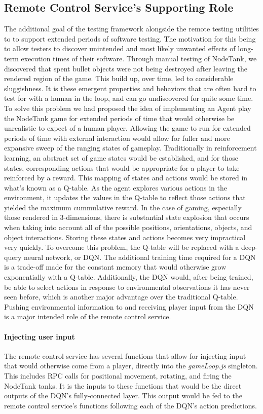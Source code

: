 \documentclass[conference]{IEEEtran}
\begin{document}
\subsection{Remote Control Service's Supporting Role}
The additional goal of the testing framework alongside the remote testing utilities to to support extended periods of software testing. The motivation for this being to allow testers to discover unintended and most likely unwanted effects of long-term execution times of their software. Through manual testing of NodeTank, we discovered that spent bullet objects were not being destroyed after leaving the rendered region of the game. This build up, over time, led to considerable sluggishness. It is these emergent properties and behaviors that are often hard to test for with a human in the loop, and can go undiscovered for quite some time. To solve this problem we had proposed the idea of implementing an Agent play the NodeTank game for extended periods of time that would otherwise be unrealistic to expect of a human player. Allowing the game to run for extended periods of time with external interaction would allow for fuller and more expansive sweep of the ranging states of gameplay. Traditionally in reinforcement learning, an abstract set of game states would be established, and for those states, corresponding actions that would be appropriate for a player to take reinforced by a reward. This mapping of states and actions would be stored in what's known as a Q-table. As the agent explores various actions in the environment, it updates the values in the Q-table to reflect those actions that yielded the maximum cummulative reward. In the case of gaming, especially those rendered in 3-dimensions, there is substantial state explosion that occurs when taking into account all of the possible positions, orientations, objects, and object interactions. Storing these states and actions becomes very impractical very quickly. To overcome this problem, the Q-table will be replaced with a deep-query neural network, or DQN. The additional training time required for a DQN is a trade-off made for the constant memory that would otherwise grow exponentially with a Q-table. Additionally, the DQN would, after being trained, be able to select actions in response to environmental observations it has never seen before, which is another major advantage over the traditional Q-table. Pushing environmental information to and receiving player input from the DQN is a major intended role of the remote control service.
\paragraph{Injecting user input}
The remote control service has several functions that allow for injecting input that would otherwise come from a player, directly into the \textit{gameLoop.js} singleton. This includes RPC calls for positional movement, rotating, and firing the NodeTank tanks. It is the inputs to these functions that would be the direct outputs of the DQN's fully-connected layer. This output would be fed to the remote control service's functions following each of the DQN's action predictions.
\end{document}
